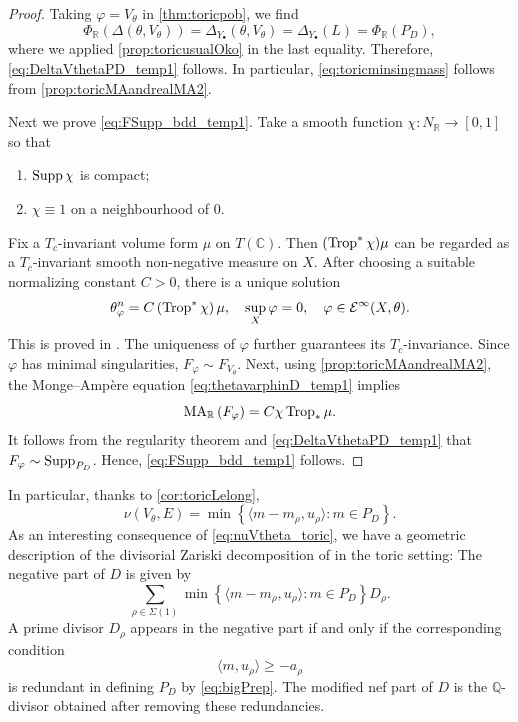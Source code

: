 \begin{proof}
    Taking $\varphi=V_{\theta}$ in \cref{thm:toricpob}, we find
    \[
    \Phi_{\mathbb{R}}\left(  \Delta(\theta,V_{\theta})\right)=\Delta_{Y_{\bullet}}(\theta,V_{\theta})=\Delta_{Y_{\bullet}}(L)=\Phi_{\mathbb{R}}(P_D),
    \]
    where we applied \cref{prop:toricusualOko} in the last equality.
    Therefore, \eqref{eq:DeltaVthetaPD_temp1} follows.
    In particular, \eqref{eq:toricminsingmass} follows from \cref{prop:toricMAandrealMA2}.

    Next we prove \eqref{eq:FSupp_bdd_temp1}. Take a smooth function $\chi\colon N_{\mathbb{R}}\rightarrow [0,1]$ so that
    \begin{enumerate}
        \item\label{itm:chapter-toricb:L672:1} $\operatorname{Supp} \chi$ is compact;
        \item\label{itm:chapter-toricb:L672:2} $\chi\equiv 1$ on a neighbourhood of $0$.
    \end{enumerate}
    Fix a $T_c$-invariant volume form $\mu$ on $T(\mathbb{C})$. Then $(\operatorname{Trop}^*\chi)\mu$ can be regarded as a $T_c$-invariant smooth non-negative measure on $X$. After choosing a suitable normalizing constant $C>0$, there is a unique solution
    \begin{equation}\label{eq:thetavarphinD_temp1}
    \theta_{\varphi}^n=C\left(\operatorname{Trop}^*\chi\right)\mu,\quad \sup_X \varphi=0,\quad \varphi\in \mathcal{E}^{\infty}(X,\theta).
    \end{equation}
    This is proved in \cite[Theorem~B]{BEGZ10}. The uniqueness of $\varphi$ further guarantees its $T_c$-invariance. Since $\varphi$ has minimal singularities, $F_{\varphi}\sim F_{V_{\theta}}$. Next, using \cref{prop:toricMAandrealMA2}, the Monge--Ampère equation \eqref{eq:thetavarphinD_temp1} implies
    \[
    \operatorname{MA}_{\mathbb{R}}\left(F_{\varphi}\right)=C \chi \operatorname{Trop}_*\mu.
    \]
    It follows from the regularity theorem \cite[Theorem~2.19]{BB13} and \eqref{eq:DeltaVthetaPD_temp1} that $F_{\varphi}\sim \operatorname{Supp}_{P_D}$. Hence, \eqref{eq:FSupp_bdd_temp1} follows.
\end{proof}


In particular, thanks to \cref{cor:toricLelong},
\begin{equation}\label{eq:nuVtheta_toric}
\nu(V_{\theta},E)=\min \left\{ \langle m-m_{\rho},u_{\rho}\rangle : m\in P_D \right\}.
\end{equation}
As an interesting consequence of \eqref{eq:nuVtheta_toric}, we have a geometric description of the divisorial Zariski decomposition of \cite{Bou02} in the toric setting: The negative part of $D$ is given by
\[
\sum_{\rho\in \Sigma(1)} \min \left\{ \langle m-m_{\rho},u_{\rho}\rangle : m\in P_D \right\} D_{\rho}.
\]
A prime divisor $D_{\rho}$ appears in the negative part if and only if the corresponding condition
\[
\langle m,u_{\rho} \rangle \geq -a_{\rho}
\]
is redundant in defining $P_D$ by \eqref{eq:bigPrep}. The modified nef part of $D$ is the $\mathbb{Q}$-divisor obtained after removing these redundancies.



